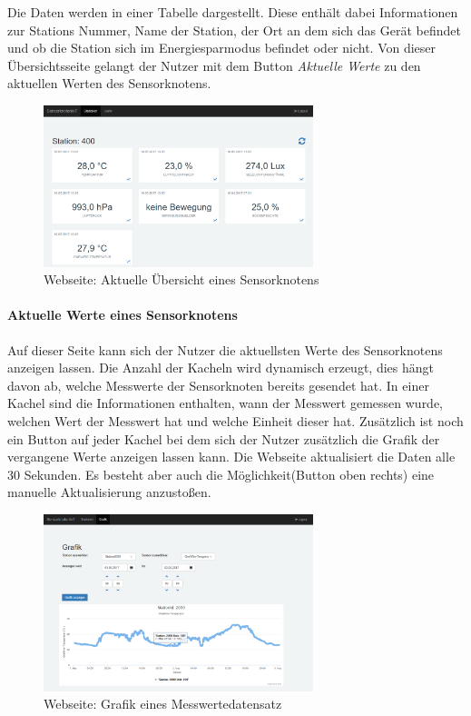 Die Daten werden in einer Tabelle dargestellt. Diese enthält dabei Informationen zur Stations Nummer, Name der Station, der Ort an dem sich das Gerät befindet und ob die Station sich im Energiesparmodus befindet oder nicht. Von dieser Übersichtsseite gelangt der Nutzer mit dem Button \textit{Aktuelle Werte} zu den aktuellen Werten des Sensorknotens. 
\begin{figure}
	\centering
	\includegraphics[width=0.7\textwidth]{bilder/WebseiteSensorknotenAktuell}
	\caption{Webseite: Aktuelle Übersicht eines Sensorknotens}
	\label{img:WebseiteSensorknotenAktuell}
\end{figure}
\paragraph{Aktuelle Werte eines Sensorknotens} Auf dieser Seite kann sich der Nutzer die aktuellsten Werte des Sensorknotens anzeigen lassen. Die Anzahl der Kacheln wird dynamisch erzeugt, dies hängt davon ab,  welche Messwerte der Sensorknoten bereits gesendet hat. In einer Kachel sind die Informationen enthalten, wann der Messwert gemessen wurde, welchen Wert der Messwert hat und welche Einheit dieser hat. Zusätzlich ist noch ein Button auf jeder Kachel bei dem sich der Nutzer zusätzlich die Grafik der vergangene Werte anzeigen lassen kann. Die Webseite aktualisiert die Daten alle 30 Sekunden. Es besteht aber auch die Möglichkeit(Button oben rechts) eine manuelle Aktualisierung anzustoßen.
\begin{figure}
	\centering
	\includegraphics[width=0.7\textwidth]{bilder/WebseiteGrafik}
	\caption{Webseite: Grafik eines Messwertedatensatz}
	\label{img:WebseiteGrafik}
\end{figure}

